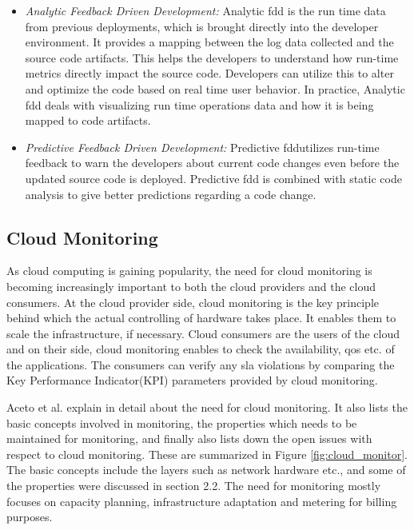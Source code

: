 \documentclass[article,type=msc,colorback,12pt,accentcolor=tud8b,table]{tudthesis}
\begin{document}
		\begin{itemize}
			\item{\textit{Analytic Feedback Driven Development: }}
			Analytic \gls{fdd} is the run time data from previous deployments, which is brought directly into the developer environment. It provides a mapping between the log data collected and the source code artifacts. This helps the developers to understand how run-time metrics directly impact the source code. Developers can utilize this to alter and optimize the code based on real time user behavior. In practice, Analytic \gls{fdd} deals with visualizing run time operations data and how it is being mapped to code artifacts. 
			
			\item{\textit{Predictive Feedback Driven Development: }}
			 Predictive \gls{fdd}utilizes run-time feedback to warn the developers about current code changes even before the updated source code is deployed. Predictive \gls{fdd} is combined with static code analysis to give better predictions regarding a code change. 
		\end{itemize}
	
	\subsection{Cloud Monitoring}
 	
 	As cloud computing is gaining popularity, the need for cloud monitoring is becoming increasingly important to  both the cloud providers and the cloud consumers. At the cloud provider side, cloud monitoring is the key principle behind which the actual controlling of hardware takes place. It enables them to scale the infrastructure, if necessary. Cloud consumers are the users of the cloud and on their side, cloud monitoring enables to check the availability, \gls{qos} etc. of the applications. The consumers can verify any \gls{sla} violations by comparing the Key Performance Indicator(KPI) parameters provided by cloud monitoring.
 	
 	Aceto et al. \cite{aceto2013cloud} explain in detail about the need for cloud monitoring. It also lists the basic concepts involved in monitoring, the properties which needs to be maintained for monitoring, and finally also lists down the open issues with respect to cloud monitoring. These are summarized in Figure \ref{fig:cloud_monitor}. The basic concepts include the layers such as network hardware etc., and some of the properties were discussed in section 2.2. The need for monitoring mostly focuses on capacity planning, infrastructure adaptation and metering for billing purposes.
 	
\end{document}
